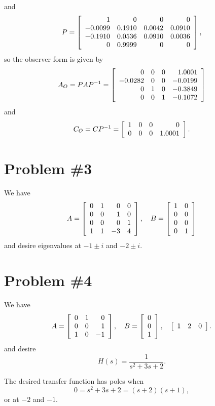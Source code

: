 \documentclass{article}
\begin{document}
\begin{enumerate}[(a)]
{$$      $$
      and
      $$
      P =
      \left[\begin{array}{r r r r}
             1 &      0 &      0 &      0 \\
       -0.0099 & 0.1910 & 0.0042 & 0.0910 \\
       -0.1910 & 0.0536 & 0.0910 & 0.0036 \\
             0 & 0.9999 &      0 &      0
      \end{array}\right],
      $$
      so the observer form is given by
      $$
      A_O = P A P^{-1} =
      \left[\begin{array}{r r r r}
             0 & 0 & 0 &  1.0001 \\
       -0.0282 & 0 & 0 & -0.0199 \\
             0 & 1 & 0 & -0.3849 \\
             0 & 0 & 1 & -0.1072
      \end{array}\right]
      $$
      and
      $$
      C_O = CP^{-1} =
      \left[\begin{array}{r r r r}
        1 & 0 & 0 &      0 \\
        0 & 0 & 0 & 1.0001
      \end{array}\right].
      $$
}
\end{enumerate}

\pagebreak

\section*{Problem \#3}
We have
$$
A =
\left[\begin{array}{r r r r}
  0 & 1 &  0 & 0 \\
  0 & 0 &  1 & 0 \\
  0 & 0 &  0 & 1 \\
  1 & 1 & -3 & 4
\end{array}\right], \quad
B =
\left[\begin{array}{r r}
  1 & 0 \\
  0 & 0 \\
  0 & 0 \\
  0 & 1
\end{array}\right]
$$
and desire eigenvalues at $-1 \pm i$ and $-2 \pm i$.

\pagebreak

\section*{Problem \#4}
We have
$$
A =
\left[\begin{array}{r r r}
  0 & 1 &  0 \\
  0 & 0 &  1 \\
  1 & 0 & -1
\end{array}\right], \quad
B =
\left[\begin{array}{r}
  0 \\
  0 \\
  1
\end{array}\right], \quad
\left[\begin{array}{r r r}
  1 & 2 &  0
\end{array}\right].
$$
and desire
$$
H(s) = \frac{1}{s^2 + 3s + 2}.
$$

The desired transfer function has poles when
$$
0 = s^2 + 3s + 2 = (s + 2)(s + 1),
$$
or at $-2$ and $-1$.
\end{document}

